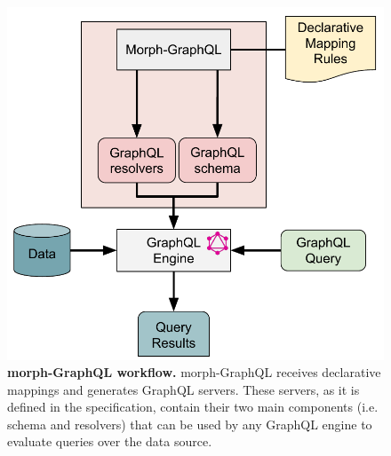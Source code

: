 \begin{figure}[ht]
    \centering
    \includegraphics[width=0.8\linewidth]{figures/workflow-morphgraphql.pdf}
    \caption[morph-GraphQL workflow]{\textbf{morph-GraphQL workflow.} morph-GraphQL receives declarative mappings and generates GraphQL servers. These servers, as it is defined in the specification, contain their two main components (i.e. schema and resolvers) that can be used by any GraphQL engine to evaluate queries over the data source.}
    \label{fig:obda2graphql}
\end{figure}



